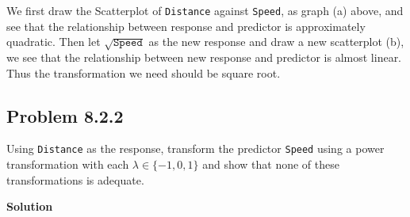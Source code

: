 \documentclass[12pt,oneside,a4paper]{article}\usepackage[]{graphicx}\usepackage[]{xcolor}
\newenvironment{knitrout}{}{} %
\newcommand{\subproblem}[1]
{
    \subsection*{Problem {#1}}
}
\newcommand{\solution}
{
    \vspace{15pt}
    \noindent\ignorespaces\textbf{\large Solution}
}
\newcommand{\m}[1]{\texttt{{#1}}}
\begin{document}
\begin{knitrout}
{}



\end{knitrout}

We first draw the Scatterplot of \m{Distance} against \m{Speed}, as graph (a) above, and see that the relationship between response and predictor is approximately quadratic. Then let $\sqrt{\m{Speed}}$ as the new response and draw a new scatterplot (b), we see that the relationship between new response and predictor is almost linear. Thus the transformation we need should be square root.

\subproblem{8.2.2}
Using \m{Distance} as the response, transform the predictor \m{Speed} using a power transformation with each $\lambda \in \{-1,0,1\}$ and show that none of these transformations is adequate.

\solution
\end{document}
